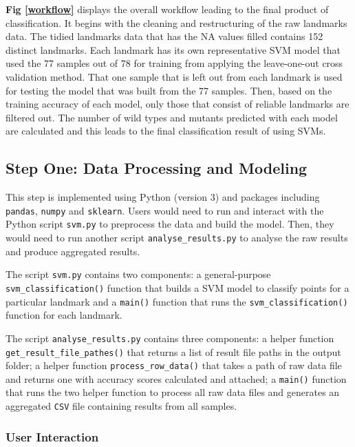 \documentclass[10pt,letterpaper]{article}
\begin{document}
\textbf{Fig \ref{workflow}} displays the overall workflow leading to the
final product of classification. It begins with the cleaning and
restructuring of the raw landmarks data. The tidied landmarks data that
has the NA values filled contains 152 distinct landmarks. Each landmark
has its own representative SVM model that used the 77 samples out of 78
for training from applying the leave-one-out cross validation method.
That one sample that is left out from each landmark is used for testing
the model that was built from the 77 samples. Then, based on the
training accuracy of each model, only those that consist of reliable
landmarks are filtered out. The number of wild types and mutants
predicted with each model are calculated and this leads to the final
classification result of using SVMs.

\subsection{Step One: Data Processing and
Modeling}\label{step-one-data-processing-and-modeling}

This step is implemented using Python (version 3) and packages including
\texttt{pandas}, \texttt{numpy} and \texttt{sklearn}. Users would need
to run and interact with the Python script \texttt{svm.py} to preprocess
the data and build the model. Then, they would need to run another
script \texttt{analyse\_results.py} to analyse the raw results and
produce aggregated results.

The script \texttt{svm.py} contains two components: a general-purpose
\texttt{svm\_classification()} function that builds a SVM model to
classify points for a particular landmark and a \texttt{main()} function
that runs the \texttt{svm\_classification()} function for each landmark.

The script \texttt{analyse\_results.py} contains three components: a
helper function \texttt{get\_result\_file\_pathes()} that returns a list
of result file paths in the output folder; a helper function
\texttt{process\_row\_data()} that takes a path of raw data file and
returns one with accuracy scores calculated and attached; a
\texttt{main()} function that runs the two helper function to process
all raw data files and generates an aggregated \texttt{CSV} file
containing results from all samples.

\subsubsection{User Interaction}\label{user-interaction}
\end{document}
